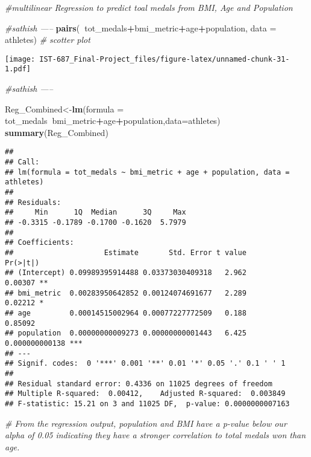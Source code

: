 \documentclass[]{article}
\newenvironment{Shaded}{\begin{snugshade}}{\end{snugshade}}
\newcommand{\CommentTok}[1]{\textcolor[rgb]{0.56,0.35,0.01}{\textit{#1}}}
\newcommand{\DataTypeTok}[1]{\textcolor[rgb]{0.13,0.29,0.53}{#1}}
\newcommand{\KeywordTok}[1]{\textcolor[rgb]{0.13,0.29,0.53}{\textbf{#1}}}
\newcommand{\NormalTok}[1]{#1}
\newcommand{\OperatorTok}[1]{\textcolor[rgb]{0.81,0.36,0.00}{\textbf{#1}}}
\begin{document}
\begin{Shaded}
\begin{Highlighting}[]
\CommentTok{#multilinear Regression to predict toal medals from BMI, Age and Population}

\CommentTok{#sathish -----}
\KeywordTok{pairs}\NormalTok{(}\OperatorTok{~}\NormalTok{tot_medals}\OperatorTok{+}\NormalTok{bmi_metric}\OperatorTok{+}\NormalTok{age}\OperatorTok{+}\NormalTok{population, }\DataTypeTok{data =}\NormalTok{ athletes)  }\CommentTok{# scotter plot}
\end{Highlighting}
\end{Shaded}

\texttt{[image: IST-687\_Final-Project\_files/figure-latex/unnamed-chunk-31-1.pdf]}

\begin{Shaded}
\begin{Highlighting}[]
\CommentTok{#sathish -----}

\NormalTok{Reg_Combined<-}\KeywordTok{lm}\NormalTok{(}\DataTypeTok{formula =}\NormalTok{ tot_medals}\OperatorTok{~}\NormalTok{bmi_metric}\OperatorTok{+}\NormalTok{age}\OperatorTok{+}\NormalTok{population,}\DataTypeTok{data=}\NormalTok{athletes)}
\KeywordTok{summary}\NormalTok{(Reg_Combined)}
\end{Highlighting}
\end{Shaded}

\begin{verbatim}
## 
## Call:
## lm(formula = tot_medals ~ bmi_metric + age + population, data = athletes)
## 
## Residuals:
##     Min      1Q  Median      3Q     Max 
## -0.3315 -0.1789 -0.1700 -0.1620  5.7979 
## 
## Coefficients:
##                     Estimate       Std. Error t value       Pr(>|t|)    
## (Intercept) 0.09989395914488 0.03373030409318   2.962        0.00307 ** 
## bmi_metric  0.00283950642852 0.00124074691677   2.289        0.02212 *  
## age         0.00014515002964 0.00077227772509   0.188        0.85092    
## population  0.00000000009273 0.00000000001443   6.425 0.000000000138 ***
## ---
## Signif. codes:  0 '***' 0.001 '**' 0.01 '*' 0.05 '.' 0.1 ' ' 1
## 
## Residual standard error: 0.4336 on 11025 degrees of freedom
## Multiple R-squared:  0.00412,    Adjusted R-squared:  0.003849 
## F-statistic: 15.21 on 3 and 11025 DF,  p-value: 0.0000000007163
\end{verbatim}

\begin{Shaded}
\begin{Highlighting}[]
\CommentTok{# From the regression output, population and BMI have a p-value below our alpha of 0.05 indicating they have a stronger correlation to total medals won than age.}
\end{Highlighting}
\end{Shaded}
\end{document}
